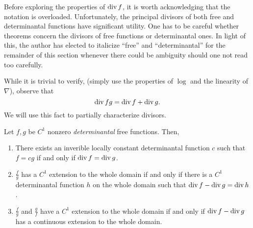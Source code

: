 Before exploring the properties of \(\operatorname{div} f\), it is worth acknowledging that
the notation is overloaded. Unfortunately, the principal divisors of both free
and determinantal functions have significant utility. One has to be careful
whether theorems concern the divisors of free functions or determinantal ones.
In light of this, the author has elected to italicize ``free'' and
``determinantal'' for the remainder of this section whenever there could be
ambiguity should one not read too carefully.

While it is trivial to verify, (simply use the properties of \(\log \) and the
linearity of \(\nabla\)), observe that
\[
  \operatorname{div} fg = \operatorname{div} f + \operatorname{div} g.
\]
We will use this fact to partially characterize divisors.

\begin{lemma}%
\label{lem:ob21}
  Let \(f,g\) be \(C^1\) nonzero \emph{determinantal} free functions. Then,
  \begin{enumerate}
    \item There exists an inverible locally constant determinantal function
          \(c\) such that \(f=cg\) if and only if \(\operatorname{div} f = \operatorname{div} g\).
    \item \(\frac{f}{g} \)  has a \(C^1\) extension to the whole domain if and
          only if there is a \(C^1\) determinantal function \(h\) on the whole
          domain such that \(\operatorname{div} f - \operatorname{div} g = \operatorname{div} h\).
    \item \(\frac{f}{g}\) and \(\frac{g}{f}\) have a \(C^1\) extension to the
          whole domain if and only if \(\operatorname{div} f - \operatorname{div} g\) has a continuous
          extension to the whole domain.
  \end{enumerate}
\end{lemma}

